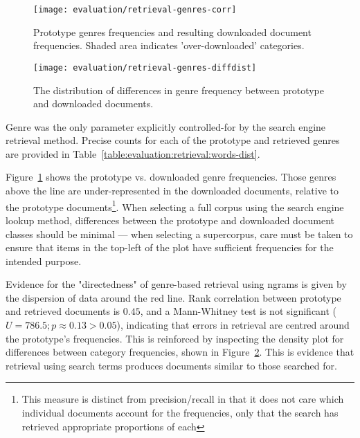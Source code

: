 \begin{figure}[Ht]
    \centering
    \texttt{[image: evaluation/retrieval-genres-corr]}
    \caption{Prototype genres frequencies and resulting downloaded document frequencies.  Shaded area indicates 'over-downloaded' categories.}
    \label{fig:evaluation:retrieval:genres-corr}
\end{figure}


\begin{figure}[Ht]
    \centering
    \texttt{[image: evaluation/retrieval-genres-diffdist]}
    \caption{The distribution of differences in genre frequency between prototype and downloaded documents.}
    \label{fig:evaluation:retrieval:genres-diffdist}
\end{figure}



Genre was the only parameter explicitly controlled-for by the search engine retrieval method.  Precise counts for each of the prototype and retrieved genres are provided in Table~\ref{table:evaluation:retrieval:words-dist}.  

Figure~\ref{fig:evaluation:retrieval:genres-corr} shows the prototype vs. downloaded genre frequencies.  Those genres above the line are under-represented in the downloaded documents, relative to the prototype documents\footnote{This measure is distinct from precision/recall in that it does not care which individual documents account for the frequencies, only that the search has retrieved appropriate proportions of each}.
When selecting a full corpus using the search engine lookup method, differences between the prototype and downloaded document classes should be minimal --- when selecting a supercorpus, care must be taken to ensure that items in the top-left of the plot have sufficient frequencies for the intended purpose.

Evidence for the "directedness" of genre-based retrieval using ngrams is given by the dispersion of data around the red line.  Rank correlation between prototype and retrieved documents is $0.45$, and a Mann-Whitney test is not significant ($U = 786.5; p \approx 0.13 > 0.05$), indicating that errors in retrieval are centred around the prototype's frequencies.  This is reinforced by inspecting the density plot for differences between category frequencies, shown in Figure~\ref{fig:evaluation:retrieval:genres-diffdist}.  This is evidence that retrieval using search terms produces documents similar to those searched for.

